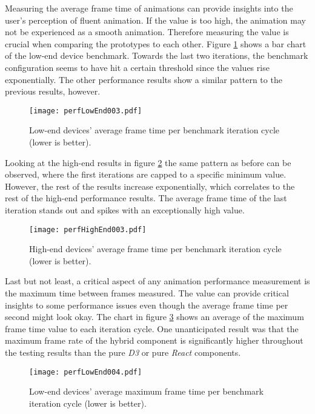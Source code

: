 
Measuring the average frame time of animations can provide insights into the user's perception of fluent animation. If the value is too high, the animation may not be experienced as a smooth animation. Therefore measuring the value is crucial when comparing the prototypes to each other. Figure \ref{fig:perfLowEnd003} shows a bar chart of the low-end device benchmark. Towards the last two iterations, the benchmark configuration seems to have hit a certain threshold since the values rise exponentially. The other performance results show a similar pattern to the previous results, however.

\begin{figure}
\centering
\texttt{[image: perfLowEnd003.pdf]}
\caption{Low-end devices' average frame time per benchmark iteration cycle (lower is better).}
\label{fig:perfLowEnd003}
\end{figure}

Looking at the high-end results in figure \ref{fig:perfHighEnd003} the same pattern as before can be observed, where the first iterations are capped to a specific minimum value. However, the rest of the results increase exponentially, which correlates to the rest of the high-end performance results. The average frame time of the last iteration stands out and spikes with an exceptionally high value.

\begin{figure}
\centering
\texttt{[image: perfHighEnd003.pdf]}
\caption{High-end devices' average frame time per benchmark iteration cycle (lower is better).}
\label{fig:perfHighEnd003}
\end{figure}

Last but not least, a critical aspect of any animation performance measurement is the maximum time between frames measured. The value can provide critical insights to some performance issues even though the average frame time per second might look okay. The chart in figure \ref{fig:perfLowEnd004} shows an average of the maximum frame time value to each iteration cycle. One unanticipated result was that the maximum frame rate of the hybrid component is significantly higher throughout the testing results than the pure \emph{D3} or pure \emph{React} components.

\begin{figure}
\centering
\texttt{[image: perfLowEnd004.pdf]}
\caption{Low-end devices' average maximum frame time per benchmark iteration cycle (lower is better).}
\label{fig:perfLowEnd004}
\end{figure}

